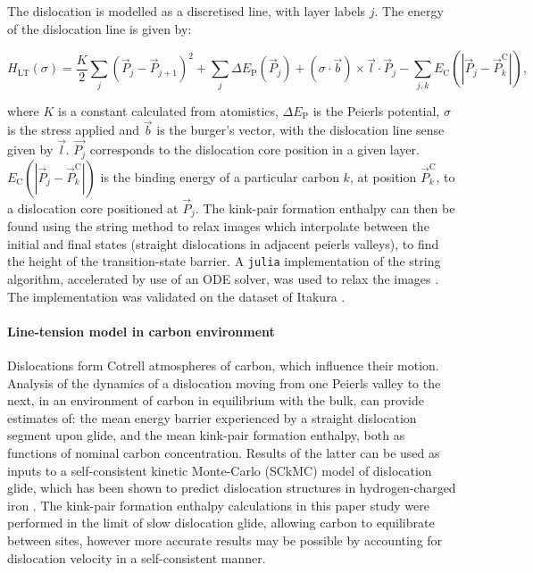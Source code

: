 \documentclass[a4paper,11pt]{article}
\numberwithin{equation}{chapter}
\numberwithin{listing}{chapter}
\begin{document}
The dislocation is modelled as a discretised line, with layer labels \(j\). The energy of the
dislocation line is given by:

\[ H_{\text{LT}}(\sigma) = \frac{K}{2} \sum_j (\vec{P}_j - \vec{P}_{j+1} )^2  + \sum_j \Delta E_{\text{P}}  (\vec{P}_j) +
   (\sigma \cdot \vec{b}) \times \vec{l} \cdot \vec{P}_j  - \sum_{j,k} E_{\text{C}} (|\vec{P}_j-\vec{P}_k^{\text{C}}|), \label{eq:line-tension}\]

where \(K\) is a constant calculated from atomistics, \(\Delta E_{\text{P}}\) is the
Peierls potential, \(\sigma\) is the stress applied and \(\vec{b}\) is the burger's vector,
with the dislocation line sense given by \(\vec{l}\). \(\vec{P_{j}}\) corresponds to the
dislocation core position in a given layer. \(E_{\text{C}}
   (|\vec{P}_j-\vec{P}_k^{\text{C}}|)\) is the binding energy of a particular carbon \(k\),
at position \(\vec{P}_k^{\text{C}}\), to a dislocation core positioned at
\(\vec{P}_j\). The kink-pair formation enthalpy can then be found using the string method
to relax images which interpolate between the initial and final states (straight
dislocations in adjacent peierls valleys), to find the height of the transition-state
barrier. A \texttt{julia} implementation of the string algorithm, accelerated by use of an ODE
solver, was used to relax the images \cite{Makri2019}. The implementation was validated
on the dataset of Itakura \cite{Itakura2012}.



\paragraph{Line-tension model in carbon environment}
\label{sec:org276c0f0}

Dislocations form Cotrell atmospheres of carbon, which influence their
motion. Analysis of the dynamics of a dislocation moving from one Peierls
valley to the next, in an environment of carbon in equilibrium with the
bulk, can provide estimates of: the mean energy barrier experienced by a
straight dislocation segment upon glide, and the mean kink-pair formation
enthalpy, both as functions of nominal carbon concentration. Results of the latter
can be used as inputs to a self-consistent kinetic Monte-Carlo
(SCkMC) model of dislocation glide, which has been shown to predict
dislocation structures in hydrogen-charged iron \cite{Gong2020}. The kink-pair
formation enthalpy calculations in this paper study were performed in
the limit of slow dislocation glide, allowing carbon to equilibrate between
sites, however more accurate results may be possible by accounting for
dislocation velocity in a self-consistent manner.
\end{document}
